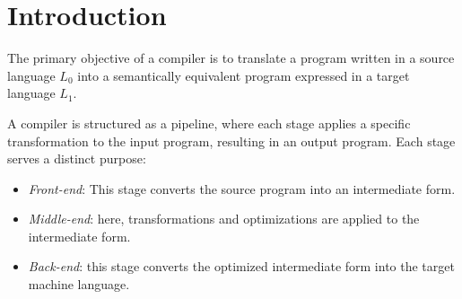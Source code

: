 \section{Introduction}

The primary objective of a compiler is to translate a program written in a source language $L_0$ into a semantically equivalent program expressed in a target language $L_1$.

A compiler is structured as a pipeline, where each stage applies a specific transformation to the input program, resulting in an output program. 
Each stage serves a distinct purpose:
\begin{itemize}
    \item \textit{Front-end}: This stage converts the source program into an intermediate form.
    \item \textit{Middle-end}: here, transformations and optimizations are applied to the intermediate form.
    \item \textit{Back-end}: this stage converts the optimized intermediate form into the target machine language.
\end{itemize}